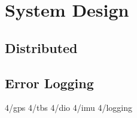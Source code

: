 
\chapter{System Design} %
\label{sec:design}


\ifpdf
    \graphicspath{{4/figures/PNG/}{4/figures/PDF/}{4/figures/}}
\else
    \graphicspath{{4/figures/EPS/}{4/figures/}}
\fi


\section{Distributed}

\section{Error Logging}
\label{sec:dmesglogging}

 {4/gps}
 {4/tbs}
 {4/dio}
 {4/imu}
 {4/logging}




